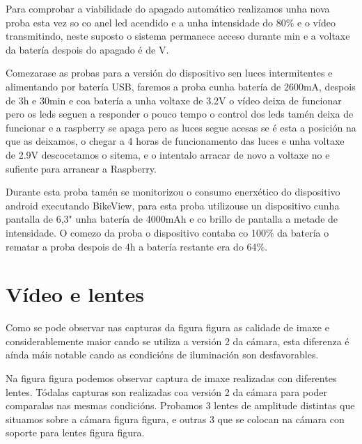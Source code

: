 Para comprobar a viabilidade do apagado automático realizamos unha nova proba esta vez so co anel led acendido e a unha intensidade do 80\(\%\) e o vídeo transmitindo, neste suposto o sistema permanece acceso durante  min e a voltaxe da batería despois do apagado é de V.

Comezarase as probas para a versión do dispositivo sen luces intermitentes e alimentando por batería USB, faremos a proba cunha batería de  2600mA, despois de 3h e 30min e coa batería a unha voltaxe de 3.2V o vídeo deixa de funcionar pero os leds seguen a responder o pouco tempo o control dos leds tamén deixa de funcionar e a raspberry se apaga pero as luces segue acesas se é esta a posición na que as deixamos,  o chegar a 4 horas de funcionamento das luces e unha voltaxe de 2.9V descocetamos o sitema, e o intentalo arracar de novo a voltaxe no e sufiente para arrancar a Raspberry.

Durante esta proba tamén se monitorizou o consumo enerxético do dispositivo android executando BikeView, para esta proba utilizouse un dispositivo cunha pantalla de 6,3" unha batería de 4000mAh e co brillo de pantalla a metade de intensidade. O comezo da proba o dispositivo contaba co 100\(\%\) da batería o rematar a proba despois de 4h a batería restante era do 64\(\%\).

\section{Vídeo e lentes}
Como se pode observar nas capturas da figura figura as calidade de imaxe e considerablemente maior cando se utiliza a versión 2 da cámara, esta diferenza é aínda máis notable cando as condicións de iluminación son desfavorables.

Na figura figura podemos observar captura de imaxe realizadas con diferentes lentes. Tódalas capturas son realizadas coa versión 2 da cámara para poder comparalas nas mesmas condicións. Probamos 3 lentes de amplitude distintas que situamos sobre a cámara figura figura, e outras 3 que se colocan na cámara con soporte para lentes figura figura.

